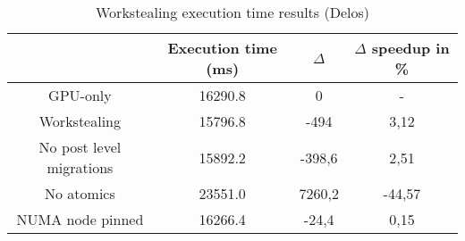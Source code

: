 \begin{table}[H]
  \centering
  \begin{tabular}{||c | c | c | c||} 
   \hline
   & Execution time (ms) & $\Delta$ & $\Delta$ speedup in \% \\ 
   \hline\hline
   GPU-only & 16290.8 & 0 & -\\
   Workstealing & 15796.8 & -494 & 3,12 \\ 
   No post level migrations & 15892.2 & -398,6 & 2,51 \\
   No atomics & 23551.0 & 7260,2 & -44,57 \\
   NUMA node pinned & 16266.4 & -24,4 & 0,15 \\ [1ex] 
   \hline
  \end{tabular}
  \caption{Workstealing execution time results (Delos)}
  \label{table:workst_delos}
\end{table}